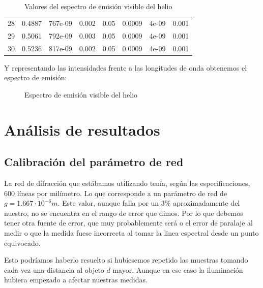 \documentclass[11pt, a4paper, twocolumn]{article}
\begin{document}
\begin{table}[h]
{\begin{tabular}{cccccccc}
           28 &         0.4887 & 767e-09 &                  0.002 &               0.05 &               0.0009 &         4e-09 &              0.001 \\
           29 &         0.5061 & 792e-09 &                  0.003 &               0.05 &               0.0009 &         4e-09 &              0.001 \\
           30 &         0.5236 & 817e-09 &                  0.002 &               0.05 &               0.0009 &         4e-09 &              0.001 \\
\hline
\end{tabular}
   }
\caption{Valores del espectro de emisión visible del helio}
\label{tab: TablaHedio}

\end{table}

Y representando las intensidades frente a las longitudes de onda obtenemos 
el espectro de emisión:

\begin{figure}[h]
	\centering
	
	\caption{Espectro de emisión visible del helio}
	\label{espectroHe}
\end{figure}

\newpage

\section{Análisis de resultados}
\subsection{Calibración del parámetro de red}

La red de difracción que estábamos utilizando tenía, según las especificaciones,
$600$ líneas por milímetro. Lo que corresponde a un parámetro de red de 
$g=1.667\cdot10^{-6} m$. Este valor, aunque falla por un $3\%$ aproximadamente 
del nuestro, no se encuentra en el rango de error que dimos. Por lo que debemos 
tener otra fuente de error, que muy probablemente será o el error de paralaje 
al medir o que la medida fuese incorrecta al tomar la linea espectral desde un 
punto equivocado.

\vspace{0.2cm}

Esto podríamos haberlo resuelto si hubiesemos repetido las muestras tomando cada 
vez una distancia al objeto $d$ mayor. Aunque en ese caso la iluminación hubiera empezado 
a afectar nuestras medidas.
\end{document}
